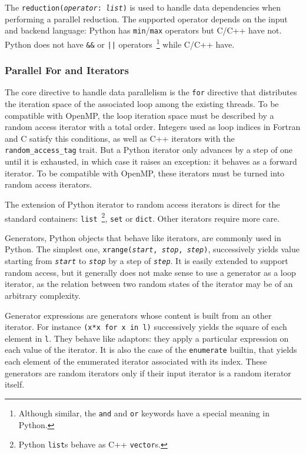 \documentclass{llncs}
\begin{document}
The \texttt{reduction(\emph{operator}: \emph{list})} is used to handle data
dependencies when performing a parallel reduction. The supported operator
depends on the input and backend language: Python has \texttt{min}/\texttt{max} operators but
C/C++ have not. Python does not have \texttt{\&\&} or \texttt{||}
operators~\footnote{Although similar, the \texttt{and} and \texttt{or} keywords
have a special meaning in Python.} while C/C++ have.

\subsubsection{Parallel For and Iterators}

The core directive to handle data parallelism is the \texttt{for} directive that
distributes the iteration space of the associated loop among the existing
threads. To be compatible with OpenMP, the loop iteration space must be
described by a random access iterator with a total order. Integers used as
loop indices in Fortran and C satisfy this conditions, as well as C++ iterators with
the \texttt{random\_access\_tag} trait. But a Python iterator only advances by a
step of one until it is exhausted, in which case it raises an exception: it
behaves as a forward iterator. To be compatible with OpenMP, these iterators
must be turned into random access iterators.

The extension of Python iterator to random access iterators is direct for the
standard containers: \texttt{list}~\footnote{Python \texttt{list}s behave as C++
\texttt{vector}s.}, \texttt{set} or \texttt{dict}. Other iterators require more
care.

Generators, Python objects that behave like iterators, are commonly used in
Python. The simplest one, \texttt{xrange(\emph{start}, \emph{stop},
\emph{step})}, successively yields value starting from \texttt\emph{start} to
\texttt\emph{stop} by a step of \texttt\emph{step}. It is easily extended to
support random access, but it generally does not make sense to use a generator
as a loop iterator, as the relation between two random states of the iterator
may be of an arbitrary complexity.

Generator expressions are generators whose content is built from an other
iterator. For instance \texttt{(x*x for x in l)} successively yields the square
of each element in \texttt{l}. They behave like adaptors: they apply a
particular expression on each value of the iterator. It is also the case of the
\texttt{enumerate} builtin, that yields each element of the enumerated iterator
associated with its index. These generators are random iterators only if their
input iterator is a random iterator itself.
\end{document}
